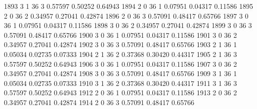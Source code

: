 \documentclass{article}
\begin{document}
\begin{Woutput}
1893      3       1      36       3       0.57597    0.50252    0.64943
1894      2       0      36       1       0.07951    0.04317    0.11586
1895      2       0      36       2       0.34957    0.27041    0.42874
1896      2       0      36       3       0.57091    0.48417    0.65766
1897      3       0      36       1       0.07951    0.04317    0.11586
1898      3       0      36       2       0.34957    0.27041    0.42874
1899      3       0      36       3       0.57091    0.48417    0.65766
1900      3       0      36       1       0.07951    0.04317    0.11586
1901      3       0      36       2       0.34957    0.27041    0.42874
1902      3       0      36       3       0.57091    0.48417    0.65766
1903      2       1      36       1       0.05034    0.02735    0.07333
1904      2       1      36       2       0.37368    0.30420    0.44317
1905      2       1      36       3       0.57597    0.50252    0.64943
1906      3       0      36       1       0.07951    0.04317    0.11586
1907      3       0      36       2       0.34957    0.27041    0.42874
1908      3       0      36       3       0.57091    0.48417    0.65766
1909      3       1      36       1       0.05034    0.02735    0.07333
1910      3       1      36       2       0.37368    0.30420    0.44317
1911      3       1      36       3       0.57597    0.50252    0.64943
1912      2       0      36       1       0.07951    0.04317    0.11586
1913      2       0      36       2       0.34957    0.27041    0.42874
1914      2       0      36       3       0.57091    0.48417    0.65766


\end{Woutput}
\end{document}
